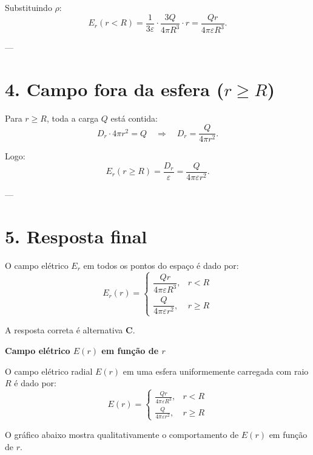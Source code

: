 \begin{flushleft}
Substituindo \(\rho\):
\[
E_r(r<R) =
\frac{1}{3\varepsilon} \cdot \frac{3Q}{4\pi R^3} \cdot r =
\frac{Q r}{4\pi \varepsilon R^3}.
\]

---

\section*{4. Campo fora da esfera (\( r \geq R \))}

Para \( r \geq R \), toda a carga \( Q \) está contida:
\[
D_r \cdot 4\pi r^2 = Q \quad \Rightarrow \quad D_r = \frac{Q}{4\pi r^2}.
\]

Logo:
\[
E_r(r \geq R) =
\frac{D_r}{\varepsilon} =
\frac{Q}{4\pi \varepsilon r^2}.
\]

---

\section*{5. Resposta final}

O campo elétrico \( E_r \) em todos os pontos do espaço é dado por:
\[
\boxed{
E_r(r) =
\begin{cases}
\dfrac{Q r}{4\pi \varepsilon R^3}, & r < R \\[12pt]
\dfrac{Q}{4\pi \varepsilon r^2}, & r \geq R
\end{cases}
}
\]

A resposta correta é alternativa \colorbox{green!50}{\textbf{C}}.
\end{flushleft}

\begin{center}
\textbf{Campo elétrico \(E(r)\) em função de \(r\)}
\end{center}

O campo elétrico radial \(E(r)\) em uma esfera uniformemente carregada com raio \(R\) é dado por:
\[
E(r) =
\begin{cases}
\displaystyle \frac{Q r}{4\pi \varepsilon R^3}, & r < R \\[12pt]
\displaystyle \frac{Q}{4\pi \varepsilon r^2}, & r \geq R
\end{cases}
\]

O gráfico abaixo mostra qualitativamente o comportamento de \(E(r)\) em função de \(r\).

\bigskip


